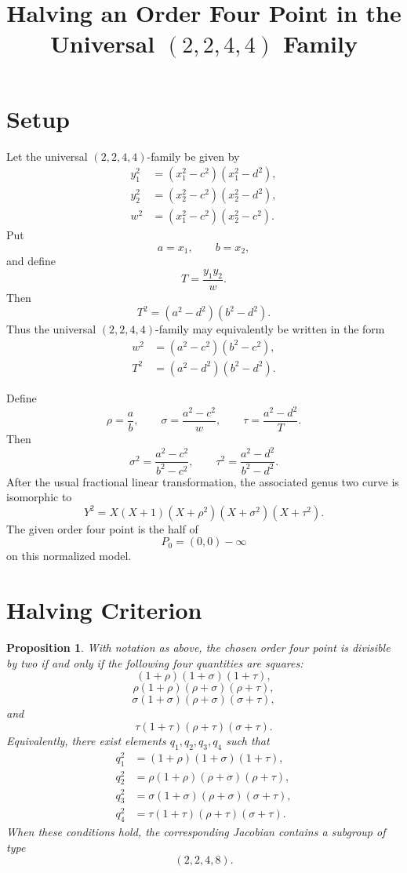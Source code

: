 \documentclass[11pt]{article}
\title{Halving an Order Four Point in the Universal \texorpdfstring{$(2,2,4,4)$}{(2,2,4,4)} Family}
\author{}
\date{}
\newtheorem{proposition}{Proposition}
\begin{document}
\maketitle

\section*{Setup}

Let the universal \((2,2,4,4)\)-family be given by
\begin{align*}
    y_1^2 &= (x_1^2-c^2)(x_1^2-d^2),\\
    y_2^2 &= (x_2^2-c^2)(x_2^2-d^2),\\
    w^2 &= (x_1^2-c^2)(x_2^2-c^2).
\end{align*}
Put
\[
a=x_1,\qquad b=x_2,
\]
and define
\[
T=\frac{y_1y_2}{w}.
\]
Then
\[
T^2=(a^2-d^2)(b^2-d^2).
\]
Thus the universal \((2,2,4,4)\)-family may equivalently be written in the form
\begin{align*}
w^2&=(a^2-c^2)(b^2-c^2),\\
T^2&=(a^2-d^2)(b^2-d^2).
\end{align*}

Define
\[
\rho=\frac{a}{b},\qquad
\sigma=\frac{a^2-c^2}{w},\qquad
\tau=\frac{a^2-d^2}{T}.
\]
Then
\[
\sigma^2=\frac{a^2-c^2}{b^2-c^2},
\qquad
\tau^2=\frac{a^2-d^2}{b^2-d^2}.
\]
After the usual fractional linear transformation, the associated genus two curve is isomorphic to
\[
Y^2=X(X+1)(X+\rho^2)(X+\sigma^2)(X+\tau^2).
\]
The given order four point is the half of
\[
P_0=(0,0)-\infty
\]
on this normalized model.

\section*{Halving Criterion}

\begin{proposition}
With notation as above, the chosen order four point is divisible by two if and only if the following four quantities are squares:
\[
(1+\rho)(1+\sigma)(1+\tau),
\]
\[
\rho(1+\rho)(\rho+\sigma)(\rho+\tau),
\]
\[
\sigma(1+\sigma)(\rho+\sigma)(\sigma+\tau),
\]
and
\[
\tau(1+\tau)(\rho+\tau)(\sigma+\tau).
\]
Equivalently, there exist elements \(q_1,q_2,q_3,q_4\) such that
\begin{align*}
q_1^2&=(1+\rho)(1+\sigma)(1+\tau),\\
q_2^2&=\rho(1+\rho)(\rho+\sigma)(\rho+\tau),\\
q_3^2&=\sigma(1+\sigma)(\rho+\sigma)(\sigma+\tau),\\
q_4^2&=\tau(1+\tau)(\rho+\tau)(\sigma+\tau).
\end{align*}
When these conditions hold, the corresponding Jacobian contains a subgroup of type
\[
(2,2,4,8).
\]
\end{proposition}
\end{document}
